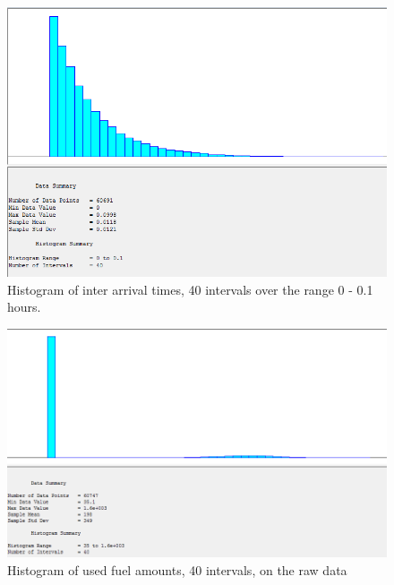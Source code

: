 \begin{figure}[h]
	\includegraphics[width=\textwidth]{images/histogram-interarrivaltimes.PNG}
	\caption{Histogram of inter arrival times, 40 intervals over the range 0 - 0.1 hours.}
	\label{fig:histogram-inter-arrivals}
\end{figure}

\begin{figure}[h]
	\includegraphics[width=\textwidth]{images/histogram-amounts-unfiltered.PNG}
	\caption{Histogram of used fuel amounts, 40 intervals, on the raw data}
	\label{fig:histogram-amounts-unfiltered}
\end{figure}

